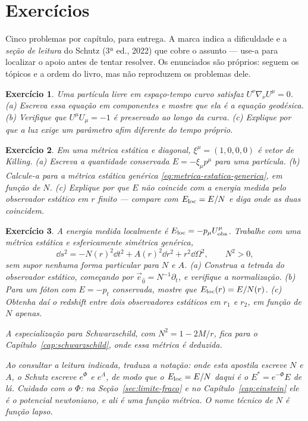 \documentclass[12pt,a4paper,oneside]{book}
\theoremstyle{rgplain}
\newtheorem{exercise}{Exercício}[chapter]
\theoremstyle{rgremark}
\begin{document}
\clearpage
\section{Exercícios}
\begin{leitura}
Cinco problemas por capítulo, para entrega. A marca indica a dificuldade e a \emph{seção de leitura} do Schutz (3ª ed., 2022) que cobre o assunto --- use-a para localizar o apoio antes de tentar resolver. Os enunciados são próprios: seguem os tópicos e a ordem do livro, mas não reproduzem os problemas dele.
\end{leitura}

\begin{exercise}
Uma partícula livre em espaço-tempo curvo satisfaz
$U^\nu\nabla_\nu U^\mu=0$. (a) Escreva essa equação em componentes e mostre
que ela é a equação geodésica. (b) Verifique que $U^\mu U_\mu=-1$ é
preservado ao longo da curva. (c) Explique por que a luz exige um parâmetro
afim diferente do tempo próprio.
\end{exercise}

\begin{exercise}
Em uma métrica estática e diagonal, $\xi^\mu=(1,0,0,0)$ é vetor de Killing.
(a) Escreva a quantidade conservada $E=-\xi_\mu p^\mu$ para uma partícula.
(b) Calcule-a para a métrica estática genérica
\eqref{eq:metrica-estatica-generica}, em função de $N$.
(c) Explique por que $E$ não coincide com a energia medida pelo observador
estático em $r$ finito --- compare com $E_{\rm loc}=E/N$ e diga onde as duas
coincidem.
\end{exercise}

\begin{exercise}
A energia medida localmente é $E_{\rm loc}=-p_\mu U^\mu_{\rm obs}$. Trabalhe
com uma métrica estática e esfericamente simétrica genérica,
\[
  \dd s^2=-N(r)^2\dd t^2+A(r)^2\dd r^2+r^2\dd\Omega^2 ,
  \qquad N^2>0 ,
\]
sem supor nenhuma forma particular para $N$ e $A$.
(a) Construa a tetrada do observador estático, começando por
$\vec e_{\hat 0}=N^{-1}\partial_t$, e verifique a normalização.
(b) Para um fóton com $E=-p_t$ conservada, mostre que
$E_{\rm loc}(r)=E/N(r)$. (c) Obtenha daí o redshift entre dois observadores
estáticos em $r_1$ e $r_2$, em função de $N$ apenas.

A especialização para Schwarzschild, com $N^2=1-2M/r$, fica para o
Capítulo~\ref{cap:schwarzschild}, onde essa métrica é deduzida.

\emph{Ao consultar a leitura indicada}, traduza a notação: onde esta apostila
escreve $N$ e $A$, o Schutz escreve $e^{\Phi}$ e $e^{\Lambda}$, de modo que o
$E_{\rm loc}=E/N$ daqui é o $E^*=e^{-\Phi}E$ de lá. Cuidado com o $\Phi$: na
Seção~\ref{sec:limite-fraco} e no Capítulo~\ref{cap:einstein} ele é o
potencial newtoniano, e ali é uma função métrica. O nome técnico de $N$ é
\emph{função lapso}.
\end{exercise}
\end{document}
